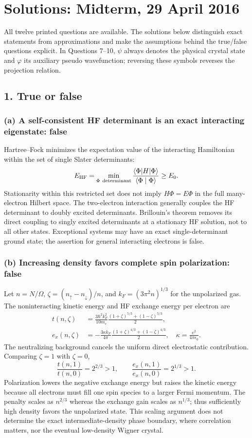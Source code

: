 \chapter{Solutions: Midterm, 29 April 2016}
\label{s:theory-2016-04-midterm}
\begin{sourceNote}
All twelve printed questions are available. The solutions below distinguish exact statements from approximations and make the assumptions behind the true/false questions explicit. In Questions 7--10, $\psi$ always denotes the physical crystal state and $\varphi$ its auxiliary pseudo wavefunction; reversing these symbols reverses the projection relation.
\end{sourceNote}

\section*{1. True or false}
\subsection*{(a) A self-consistent HF determinant is an exact interacting eigenstate: false}
Hartree--Fock minimizes the expectation value of the interacting Hamiltonian within the set of single Slater determinants:
\[
E_{\rm HF}=\min_{\Phi\ {\rm determinant}}\frac{\langle\Phi\rvert H\lvert\Phi\rangle}{\langle\Phi\mid\Phi\rangle}
\geq E_0.
\]
Stationarity within this restricted set does not imply $H\Phi=E\Phi$ in the full many-electron Hilbert space. The two-electron interaction generally couples the HF determinant to doubly excited determinants. Brillouin's theorem removes its direct coupling to singly excited determinants at a stationary HF solution, not to all other states. Exceptional systems may have an exact single-determinant ground state; the assertion for general interacting electrons is false.

\subsection*{(b) Increasing density favors complete spin polarization: false}
Let $n=N/\Omega$, $\zeta=(n_\uparrow-n_\downarrow)/n$, and $k_F=(3\pi^2n)^{1/3}$ for the unpolarized gas. The noninteracting kinetic energy and HF exchange energy per electron are
\begin{align*}
t(n,\zeta)&=\frac{3\hbar^2k_F^2}{10m_e}
\frac{(1+\zeta)^{5/3}+(1-\zeta)^{5/3}}2,\\
e_x(n,\zeta)&=-\frac{3\kappa k_F}{4\pi}
\frac{(1+\zeta)^{4/3}+(1-\zeta)^{4/3}}2,
\quad \kappa=\frac{e^2}{4\pi\epsilon_0}.
\end{align*}
The neutralizing background cancels the uniform direct electrostatic contribution. Comparing $\zeta=1$ with $\zeta=0$,
\[
\frac{t(n,1)}{t(n,0)}=2^{2/3}>1,\qquad
\frac{e_x(n,1)}{e_x(n,0)}=2^{1/3}>1.
\]
Polarization lowers the negative exchange energy but raises the kinetic energy because all electrons must fill one spin species to a larger Fermi momentum. The penalty scales as $n^{2/3}$ whereas the exchange gain scales as $n^{1/3}$; thus sufficiently high density favors the unpolarized state. This scaling argument does not determine the exact intermediate-density phase boundary, where correlation matters, nor the eventual low-density Wigner crystal.

